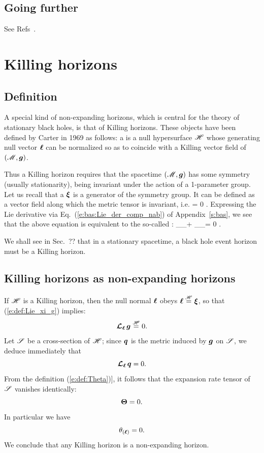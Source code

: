{{\subsection{Going further}

See Refs~\cite{GourgJ06,Jaram13,GourgJ08}.



\section{Killing horizons}

\subsection{Definition}

A special kind of non-expanding horizons, which is central for the theory of
stationary black holes, is that of Killing horizons. These objects have
been defined by Carter in 1969 \cite{Carte69} as follows: a
 is
a null hypersurface $\mathscr{H}$ whose generating null vector $\bm{\ell}$ can be normalized
so as to coincide with a Killing vector field of $(\mathscr{M},\bm{g})$.

Thus a Killing horizon requires that the spacetime $(\mathscr{M},\bm{g})$ has some symmetry
(usually stationarity), being invariant under the action of a 1-parameter group.
Let us recall that a 
$\bm{\xi}$ is a generator of the symmetry group. It can be defined as a vector
field along which the metric tensor is invariant, i.e.
\be \label{e:def:Lie_xi_g}
    \Lie{\xi}  = 0 .
\ee
Expressing the Lie derivative via Eq.~(\ref{e:bas:Lie_der_comp_nab}) of Appendix~\ref{s:bas},
we see that the above equation is equivalent to the so-called
:
\be
    \nabla_\alpha \xi_\beta + \nabla_\beta \xi_\alpha = 0 .
\ee

We shall see in Sec.~?? that in a stationary spacetime, a black hole
event horizon must be a Killing horizon.

\subsection{Killing horizons as non-expanding horizons}

If $\mathscr{H}$ is a Killing horizon, then the null normal $\bm{\ell}$ obeys $\bm{\ell} \stackrel{\mathscr{H}}{=} \bm{\xi}$,
so that (\ref{e:def:Lie_xi_g}) implies:
\[
    \bm{\mathcal{L}}_{\bm{\ell}}\, \bm{g} \stackrel{\mathscr{H}}{=} 0 .
\]
Let $\mathscr{S}$ be a cross-section of $\mathscr{H}$; since $\bm{q}$ is the metric induced by $\bm{g}$
on $\mathscr{S}$, we deduce immediately that
\[
    \bm{\mathcal{L}}_{\bm{\ell}}\, \bm{q} = 0 .
\]
From the definition (\ref{e:def:Theta})], it follows that the expansion rate
tensor of $\mathscr{S}$ vanishes identically:
\[
    \bm{\Theta} = 0 .
\]
In particular we have
\[
    \theta_{(\bm{\ell})} = 0 .
\]
We conclude that any Killing horizon is a non-expanding horizon.

}}
